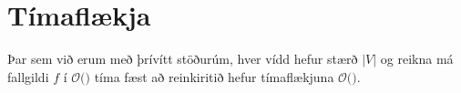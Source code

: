 \section{Tímaflækja}
{
    {
        \item<1-> Þar sem við erum með þrívítt stöðurúm, hver vídd hefur stærð $|V|$ og reikna má fallgildi $f$ í
                    $\mathcal{O}($$)$ tíma fæst að reinkiritið hefur tímaflækjuna $\mathcal{O}($$)$.

    }
}

\iffalse
{}
{
}

{
}

{
}

{
}

{
}

{
}

{
}

{
}

{
}


